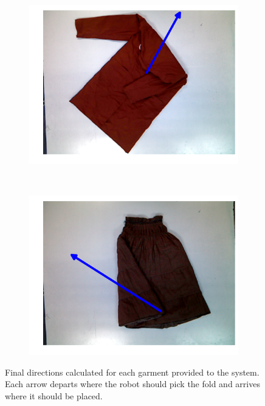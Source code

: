 \begin{figure}[htbp]
\begin{subfigure}[l]{0.49\textwidth}
    	\includegraphics[width=\textwidth]
    	{figures/pnp/robe19-direction.pdf}
	\end{subfigure}
	~
    \begin{subfigure}[r]{0.49\textwidth}
	    \centering
    	\includegraphics[width=\textwidth]
    	{figures/pnp/skirt7-direction.pdf}
	\end{subfigure} 
    \caption[Final directions calculated for each garment provided to the system.]
    {Final directions calculated for each garment provided to the system. Each arrow departs where the robot should pick the fold and arrives where it should be placed.}
    \label{fig:directions}
\end{figure}


